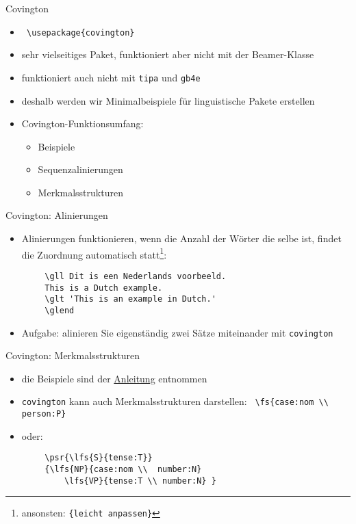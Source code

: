 \begin{frame}[fragile]{Covington}
    \begin{itemize}[<+->]
        \item  \lstinline| \usepackage{covington} |
        \item sehr vielseitiges Paket, funktioniert aber nicht mit der Beamer-Klasse
        \item funktioniert auch nicht mit \texttt{tipa} und \texttt{gb4e}
        \item deshalb werden wir Minimalbeispiele für linguistische Pakete erstellen
        \item Covington-Funktionsumfang:
        \begin{itemize}
            \item Beispiele
            \item Sequenzalinierungen
            \item Merkmalsstrukturen
        \end{itemize}
    \end{itemize}
\end{frame}

\begin{frame}[fragile]{Covington: Alinierungen}
    \begin{itemize}[<+->]
        \item Alinierungen funktionieren, wenn die Anzahl der Wörter die selbe ist, findet die Zuordnung automatisch statt\footnote{ansonsten: \texttt{\{leicht anpassen\}}}:
    \end{itemize}
    \begin{lstlisting}
        \gll Dit is een Nederlands voorbeeld.
        This is a Dutch example.
        \glt 'This is an example in Dutch.'
        \glend
    \end{lstlisting}
    \begin{itemize}
        \item Aufgabe: alinieren Sie eigenständig zwei Sätze miteinander mit \texttt{covington}
    \end{itemize}
\end{frame}

\begin{frame}[fragile]{Covington: Merkmalsstrukturen}
    \begin{itemize}[<+->]
        \item die Beispiele sind der \href{ftp://ftp.dante.de/tex-archive/macros/latex/contrib/covington/covington.pdf}{Anleitung} entnommen
        \item \texttt{covington} kann auch Merkmalsstrukturen darstellen: \lstinline| \fs{case:nom \\ person:P} |
        \item oder:
    \end{itemize}
    \begin{lstlisting}
        \psr{\lfs{S}{tense:T}}
        {\lfs{NP}{case:nom \\  number:N}
            \lfs{VP}{tense:T \\ number:N} }
    \end{lstlisting}
\end{frame}

